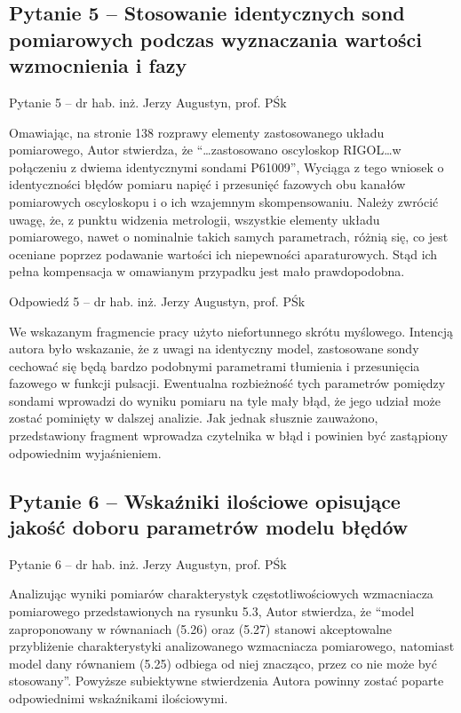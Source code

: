 \documentclass[12pt, polish, aspectratio = 169]{slides}
\begin{document}
\subsection{Pytanie 5 -- Stosowanie identycznych sond pomiarowych podczas wyznaczania wartości wzmocnienia i fazy}

\begin{frame}{Pytanie 5 -- dr hab. inż. Jerzy Augustyn, prof. PŚk}\large
\begin{justify}
Omawiając, na stronie 138 rozprawy elementy zastosowanego układu pomiarowego, Autor stwierdza, że \enquote{\dots zastosowano oscyloskop RIGOL\dots w połączeniu z dwiema identycznymi sondami P61009}, Wyciąga z tego wniosek o identyczności błędów pomiaru napięć i przesunięć fazowych obu kanałów pomiarowych oscyloskopu i o ich wzajemnym skompensowaniu. Należy zwrócić uwagę, że, z punktu widzenia metrologii, wszystkie elementy układu pomiarowego, nawet o nominalnie takich samych parametrach, różnią się, co jest oceniane poprzez podawanie wartości ich niepewności aparaturowych. Stąd ich pełna kompensacja w omawianym przypadku jest mało prawdopodobna.
\end{justify}
\end{frame}

\begin{frame}[allowframebreaks]{Odpowiedź 5 -- dr hab. inż. Jerzy Augustyn, prof. PŚk}\small
\begin{justify}
We wskazanym fragmencie pracy użyto niefortunnego skrótu myślowego. Intencją autora było wskazanie, że z uwagi na identyczny model, zastosowane sondy cechować się będą bardzo podobnymi parametrami tłumienia i przesunięcia fazowego w funkcji pulsacji. Ewentualna rozbieżność tych parametrów pomiędzy sondami wprowadzi do wyniku pomiaru na tyle mały błąd, że jego udział może zostać pominięty w dalszej analizie. Jak jednak słusznie zauważono, przedstawiony fragment wprowadza czytelnika w błąd i powinien być zastąpiony odpowiednim wyjaśnieniem.
\end{justify}
\end{frame}

\subsection{Pytanie 6 -- Wskaźniki ilościowe opisujące jakość doboru parametrów modelu błędów}

\begin{frame}{Pytanie 6 -- dr hab. inż. Jerzy Augustyn, prof. PŚk}\large
\begin{justify}
Analizując wyniki pomiarów charakterystyk częstotliwościowych wzmacniacza pomiarowego przedstawionych na rysunku 5.3, Autor stwierdza, że \enquote{model zaproponowany w równaniach (5.26) oraz (5.27) stanowi akceptowalne przybliżenie charakterystyki analizowanego wzmacniacza pomiarowego, natomiast model dany równaniem (5.25) odbiega od niej znacząco, przez co nie może być stosowany}. Powyższe subiektywne stwierdzenia Autora powinny zostać poparte odpowiednimi wskaźnikami ilościowymi.
\end{justify}
\end{frame}
\end{document}
